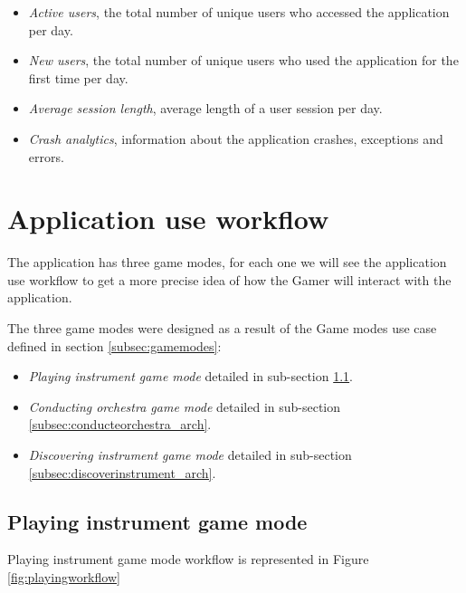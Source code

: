 \begin{itemize}
\item \textit{Active users}, the total number of unique users who accessed the application per day.
\item \textit{New users}, the total number of unique users who used the application for the first time per day.
\item \textit{Average session length}, average length of a user session per day.
\item \textit{Crash analytics}, information about the application crashes, exceptions and errors.
\end{itemize}

\section{Application use workflow}
The application has three game modes, for each one we will see the application use workflow to get a more precise idea of how the Gamer will interact with the application.

The three game modes were designed as a result of the Game modes use case defined in section \ref{subsec:gamemodes}:

\begin{itemize}
\item \textit{Playing instrument game mode} detailed in sub-section \ref{subsec:playinstrument_arch}.
\item \textit{Conducting orchestra game mode} detailed in sub-section \ref{subsec:conducteorchestra_arch}.
\item \textit{Discovering instrument game mode}  detailed in sub-section \ref{subsec:discoverinstrument_arch}.
\end{itemize}

\newpage
\subsection{Playing instrument game mode}
\label{subsec:playinstrument_arch}

Playing instrument game mode workflow is represented in Figure \ref{fig:playingworkflow}

